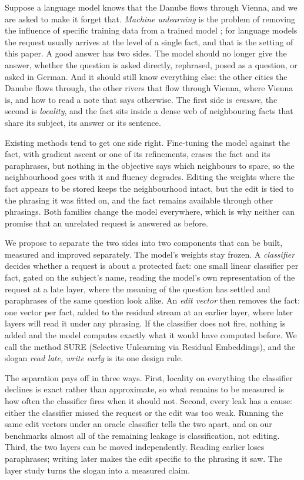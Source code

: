 \documentclass{article}
\theoremstyle{remark}
\theoremstyle{definition}
\begin{document}
Suppose a language model knows that the Danube flows through Vienna, and we are asked to make it forget that. \emph{Machine unlearning} is the problem of removing the influence of specific training data from a trained model \citep{cao2015unlearning,bourtoule2021sisa}; for language models the request usually arrives at the level of a single fact, and that is the setting of this paper. A good answer has two sides. The model should no longer give the answer, whether the question is asked directly, rephrased, posed as a question, or asked in German. And it should still know everything else: the other cities the Danube flows through, the other rivers that flow through Vienna, where Vienna is, and how to read a note that says otherwise. The first side is \emph{erasure}, the second is \emph{locality}, and the fact sits inside a dense web of neighbouring facts that share its subject, its answer or its sentence.

Existing methods tend to get one side right. Fine-tuning the model against the fact, with gradient ascent or one of its refinements, erases the fact and its paraphrases, but nothing in the objective says which neighbours to spare, so the neighbourhood goes with it and fluency degrades. Editing the weights where the fact appears to be stored keeps the neighbourhood intact, but the edit is tied to the phrasing it was fitted on, and the fact remains available through other phrasings. Both families change the model everywhere, which is why neither can promise that an unrelated request is answered as before.

We propose to separate the two sides into two components that can be built, measured and improved separately. The model's weights stay frozen. A \emph{classifier} decides whether a request is about a protected fact: one small linear classifier per fact, gated on the subject's name, reading the model's own representation of the request at a late layer, where the meaning of the question has settled and paraphrases of the same question look alike. An \emph{edit vector} then removes the fact: one vector per fact, added to the residual stream at an earlier layer, where later layers will read it under any phrasing. If the classifier does not fire, nothing is added and the model computes exactly what it would have computed before. We call the method SURE (Selective Unlearning via Residual Embeddings), and the slogan \emph{read late, write early} is its one design rule.

The separation pays off in three ways. First, locality on everything the classifier declines is exact rather than approximate, so what remains to be measured is how often the classifier fires when it should not. Second, every leak has a cause: either the classifier missed the request or the edit was too weak. Running the same edit vectors under an oracle classifier tells the two apart, and on our benchmarks almost all of the remaining leakage is classification, not editing. Third, the two layers can be moved independently. Reading earlier loses paraphrases; writing later makes the edit specific to the phrasing it saw. The layer study turns the slogan into a measured claim.
\end{document}
